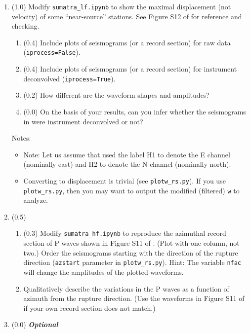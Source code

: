 \documentclass[11pt,titlepage,fleqn]{article}
\begin{document}
\begin{enumerate}
\item (1.0) Modify \verb+sumatra_lf.ipynb+ to show the maximal displacement (not velocity) of some ``near-source'' stations. See Figure S12 of \citet{Ammon2005} for reference and checking.

%
\begin{enumerate}
\item (0.4) Include plots of seismograms (or a record section) for raw data (\verb+iprocess=False+).
\item (0.4) Include plots of seismograms (or a record section) for instrument deconvolved (\verb+iprocess=True+).
\item (0.2) How different are the waveform shapes and amplitudes?
\item (0.0) On the basis of your results, can you infer whether the seismograms in \citet{Ammon2005} were instrument deconvolved or not?
\end{enumerate}
%
Notes:
%
\begin{itemize}
\item Note: Let us assume that \citet{Ammon2005} used the label H1 to denote the E channel (nominally east) and H2 to denote the N channel (nominally north).

\item Converting to displacement is trivial (see \verb+plotw_rs.py+). If you use \verb+plotw_rs.py+, then you may want to output the modified (\ie filtered) \verb+w+ to analyze.

\end{itemize}


\item (0.5) 
%
\begin{enumerate}
\item (0.3) Modify \verb+sumatra_hf.ipynb+ to reproduce the azimuthal record section of P waves shown in Figure S11 of \citet{Ammon2005}. (Plot with one column, not two.) Order the seismograms starting with the direction of the rupture direction (\verb+azstart+ parameter in \verb+plotw_rs.py+).
Hint: The variable \verb+nfac+ will change the amplitudes of the plotted waveforms.
\item Qualitatively describe the variations in the P waves as a function of azimuth from the rupture direction. (Use the waveforms in Figure S11 of \citet{Ammon2005} if your own record section does not match.)
\end{enumerate}


\pagebreak
\item (0.0) {\bf\em Optional} 

\end{enumerate}
\end{document}
